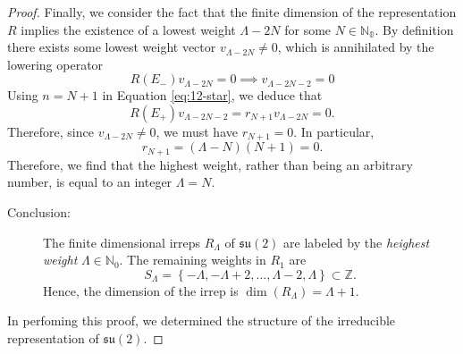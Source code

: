\begin{proof}
  Finally, we consider the fact that the finite dimension of the representation $R$ implies the existence of a lowest weight $\Lambda - 2N$ for some $N \in \mathbb{N_0}$. By definition there exists some lowest weight vector $v_{\Lambda - 2N} \neq 0$, which is annihilated by the lowering operator
  \begin{equation}
    R(E_-) v_{\Lambda - 2N} = 0 \implies v _{\Lambda - 2N - 2} = 0
  \end{equation}
  Using $n = N + 1$ in Equation \eqref{eq:12-star}, we deduce that
  \begin{equation}
    R(E_+) v_{\Lambda - 2N - 2} = r_{N+1} v_{\Lambda - 2N} = 0.
  \end{equation}
  Therefore, since $v_{\Lambda - 2N} \neq 0$, we must have $r_{N + 1} = 0$. In particular, 
  \begin{equation}
    r_{N + 1} = (\Lambda - N)(N + 1) = 0.
  \end{equation}
  Therefore, we find that the highest weight, rather than being an arbitrary number, is equal to an integer $\Lambda = N$.
  \begin{description}
    \item[Conclusion:] The finite dimensional irreps $R_\Lambda$ of $\mathfrak{su}(2)$ are labeled by the \emph{heighest weight} $\Lambda \in \mathbb{N}_0$. The remaining weights in $R_1$ are
      \begin{equation}
        S_{\Lambda} = \left\{ -\Lambda, -\Lambda + 2, \dots, \Lambda - 2, \Lambda \right\} \subset \mathbb{Z}.
      \end{equation}
      Hence, the dimension of the irrep is $\dim(R_\Lambda) = \Lambda + 1$.
  \end{description}
  In perfoming this proof, we determined the structure of the irreducible representation of $\mathfrak{su}(2)$.
\end{proof}
